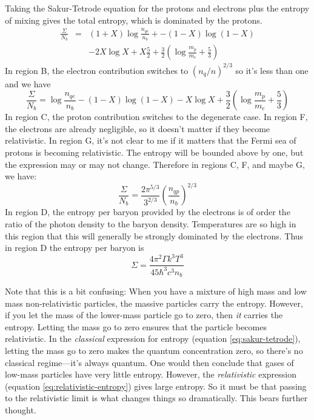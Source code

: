\documentclass{emulateapj}
\begin{document}
Taking the Sakur-Tetrode equation for the protons and electrons plus
the entropy of mixing gives the total entropy, which is dominated by
the protons.
\begin{eqnarray}
\frac{\Sigma}{N_b} &=& (1+ X) \log\frac{n_{qe}}{n_b} + 
- (1-X)\log(1-X)  \nonumber \\
& & - 2 X \log X + X \frac{5}{2} 
+ \frac{3}{2} (\log\frac{m_p}{m_e} + \frac{5}{3}) 
\end{eqnarray}
In region B, the electron contribution switches to $(n_q/n)^{2/3}$ so
it's less than one and we have
\begin{equation}
\frac{\Sigma}{N_b} = \log\frac{n_{qe}}{n_b} 
- (1-X)\log(1-X) - X \log X 
+ \frac{3}{2} (\log\frac{m_p}{m_e} + \frac{5}{3})
\end{equation}
In region C, the proton contribution switches to the degenerate case.
In region F, the electrons are already negligible, so it doesn't
matter if they become relativistic.  In region G, it's not clear to me
if it matters that the Fermi sea of protons is becoming relativistic.
The entropy will be bounded above by one, but the expression may or
may not change.  Therefore in regions C, F, and maybe G, we have:
\begin{equation}
  \frac{\Sigma}{N_b} = \frac{2 \pi^{5/3}}{3^{2/3}}\left(\frac{n_{qp}}{n_b}\right)^{2/3}
\end{equation}
In region D, the entropy per baryon provided by the electrons is of
order the ratio of the photon density to the baryon density.
Temperatures are so high in this region that this will generally be
strongly dominated by the electrons.  Thus in region D the entropy per
baryon is
\begin{equation}
  \Sigma = \frac{4 \pi^2 \Gamma k^3 T^3}{45 \hbar^3 c^3 n_b}
  \label{eq:relativistic-entropy}
\end{equation}

Note that this is a bit confusing: When you have a mixture of high
mass and low mass non-relativistic particles, the massive particles
carry the entropy.  However, if you let the mass of the lower-mass
particle go to zero, then {\em it} carries the entropy.  Letting the
mass go to zero ensures that the particle becomes relativistic.  In
the {\em classical} expression for entropy (equation
\ref{eq:sakur-tetrode}), letting the mass go to zero makes the
quantum concentration zero, so there's no classical regime---it's
always quantum.  One would then conclude that gases of low-mass
particles have very little entropy.  However, the {\em relativistic}
expression (equation \ref{eq:relativistic-entropy}) gives large
entropy.  So it must be that passing to the relativistic limit is what
changes things so dramatically.  This bears further thought.
\end{document}
